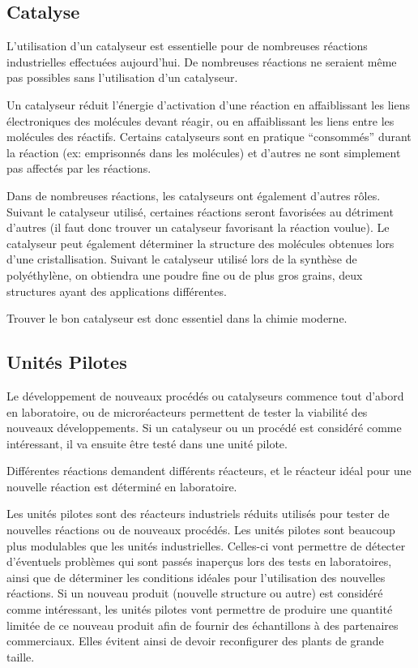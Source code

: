 \subsection{Catalyse}
\label{subsec:catalyse}

L'utilisation d'un catalyseur est essentielle pour de nombreuses réactions industrielles 
effectuées aujourd'hui. De nombreuses réactions ne seraient même pas possibles sans 
l'utilisation d'un catalyseur.
 
Un catalyseur réduit l'énergie d'activation d'une réaction en affaiblissant les liens
électroniques des molécules devant réagir, ou en affaiblissant les liens entre les 
molécules des réactifs. Certains catalyseurs sont en pratique ``consommés'' durant 
la réaction (ex: emprisonnés dans les molécules) et d'autres ne sont simplement pas 
affectés par les réactions. 

Dans de nombreuses réactions, les catalyseurs ont également d'autres rôles. 
Suivant le catalyseur utilisé, certaines réactions seront favorisées au détriment 
d'autres (il faut donc trouver un catalyseur favorisant la réaction voulue). 
Le catalyseur peut également déterminer la structure des molécules obtenues lors 
d'une cristallisation. Suivant le catalyseur utilisé lors de la synthèse de polyéthylène,
on obtiendra une poudre fine ou de plus gros grains,
deux structures ayant des applications différentes.
 
Trouver le bon catalyseur est donc essentiel dans la chimie moderne.
 
\subsection{Unités Pilotes}
 
Le développement de nouveaux procédés ou catalyseurs commence tout d'abord en laboratoire,
ou de microréacteurs permettent de tester la viabilité des nouveaux développements.
Si un catalyseur ou un procédé est considéré comme intéressant,
il va ensuite être testé dans une unité pilote. 

Différentes réactions demandent différents réacteurs,
et le réacteur idéal pour une nouvelle réaction est déterminé en laboratoire.
 
Les unités pilotes sont des réacteurs industriels réduits utilisés pour tester de
nouvelles réactions ou de nouveaux procédés. Les unités pilotes sont beaucoup plus
modulables que les unités industrielles. Celles-ci vont permettre de détecter
d'éventuels problèmes qui sont passés inaperçus lors des tests en laboratoires,
ainsi que de déterminer les conditions idéales pour l'utilisation des nouvelles réactions.
Si un nouveau produit (nouvelle structure ou autre) est considéré comme intéressant,
les unités pilotes vont permettre de produire une quantité limitée de ce nouveau
produit afin de fournir des échantillons à des partenaires commerciaux.
Elles évitent ainsi de devoir reconfigurer des plants de grande taille.

